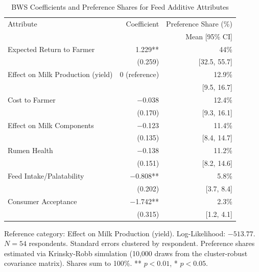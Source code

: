 \begin{table}[H]
\centering
\caption{BWS Coefficients and Preference Shares for Feed Additive Attributes}
\label{tab:support_bws}
\begin{threeparttable}
\begin{tabular}{lrr}
\toprule
Attribute & Coefficient & \multicolumn{1}{r}{Preference Share (\%)} \\
          &             & \multicolumn{1}{r}{Mean [95\% CI]} \\
\midrule
Expected Return to Farmer & 1.229** & 44\% \\
 & {\small{(0.259)}} & {\small{[32.5, 55.7]}} \\
\addlinespace[4pt]
Effect on Milk Production (yield) & 0 (reference) & 12.9\% \\
 & {\small{}} & {\small{[9.5, 16.7]}} \\
\addlinespace[4pt]
Cost to Farmer & $-$0.038 & 12.4\% \\
 & {\small{(0.170)}} & {\small{[9.3, 16.1]}} \\
\addlinespace[4pt]
Effect on Milk Components & $-$0.123 & 11.4\% \\
 & {\small{(0.135)}} & {\small{[8.4, 14.7]}} \\
\addlinespace[4pt]
Rumen Health & $-$0.138 & 11.2\% \\
 & {\small{(0.151)}} & {\small{[8.2, 14.6]}} \\
\addlinespace[4pt]
Feed Intake/Palatability & $-$0.808** & 5.8\% \\
 & {\small{(0.202)}} & {\small{[3.7, 8.4]}} \\
\addlinespace[4pt]
Consumer Acceptance & $-$1.742** & 2.3\% \\
 & {\small{(0.315)}} & {\small{[1.2, 4.1]}} \\
\bottomrule
\end{tabular}
\begin{tablenotes}[flushleft]
\footnotesize
\item Reference category: Effect on Milk Production (yield). Log-Likelihood: $-513.77$. $N = 54$ respondents. Standard errors clustered by respondent. Preference shares estimated via Krinsky-Robb simulation (10{,}000 draws from the cluster-robust covariance matrix). Shares sum to 100\%. ** $p < 0.01$, * $p < 0.05$.
\end{tablenotes}
\end{threeparttable}
\end{table}
